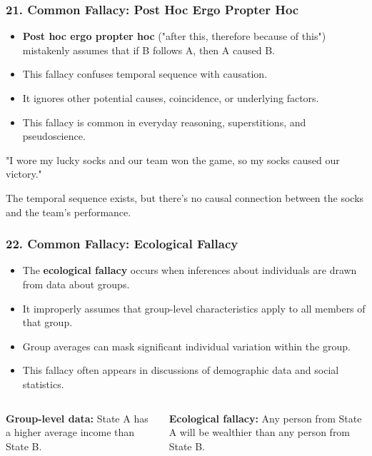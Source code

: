 \documentclass{beamer}
\begin{document}
\begin{frame}
\frametitle{21. Common Fallacy: Post Hoc Ergo Propter Hoc}
\begin{itemize}
\item \textbf{Post hoc ergo propter hoc} ("after this, therefore because of this") mistakenly assumes that if B follows A, then A caused B.
\item This fallacy confuses temporal sequence with causation.
\item It ignores other potential causes, coincidence, or underlying factors.
\item This fallacy is common in everyday reasoning, superstitions, and pseudoscience.
\end{itemize}

\begin{example}
"I wore my lucky socks and our team won the game, so my socks caused our victory."

The temporal sequence exists, but there's no causal connection between the socks and the team's performance.
\end{example}
\end{frame}

\begin{frame}
\frametitle{22. Common Fallacy: Ecological Fallacy}
\begin{itemize}
\item The \textbf{ecological fallacy} occurs when inferences about individuals are drawn from data about groups.
\item It improperly assumes that group-level characteristics apply to all members of that group.
\item Group averages can mask significant individual variation within the group.
\item This fallacy often appears in discussions of demographic data and social statistics.
\end{itemize}

\begin{columns}
\textbf{Group-level data:}
State A has a higher average income than State B.

\textbf{Ecological fallacy:}
Any person from State A will be wealthier than any person from State B.
\end{columns}
\end{frame}
\end{document}
